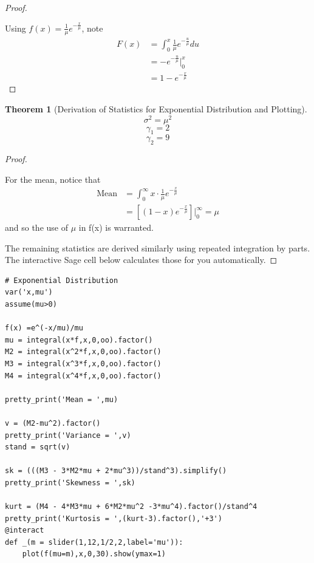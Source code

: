 \documentclass[10pt,]{book}
\theoremstyle{plain}
\newtheorem{theorem}{Theorem}[section]
\theoremstyle{definition}
\theoremstyle{definition}
\theoremstyle{definition}
\numberwithin{equation}{section}
\begin{document}
\begin{proof}\hypertarget{proof-48}{}

	Using \(f(x) = \frac{1}{\mu} e^{-\frac{x}{\mu}}\), note
	\begin{align*}
F(x) & = \int_0^x \frac{1}{\mu} e^{-\frac{u}{\mu}} du\\
 & =  - e^{-\frac{u}{\mu}} \big |_0^x\\
 & = 1 - e^{-\frac{x}{\mu}}
\end{align*}
\end{proof}
\begin{theorem}[{Derivation of Statistics for Exponential Distribution and Plotting}]\label{theorem-50}
\begin{equation*}\sigma^2 = \mu^2\end{equation*}\begin{equation*}\gamma_1 = 2\end{equation*}\begin{equation*}\gamma_2 = 9\end{equation*}\end{theorem}
\begin{proof}\hypertarget{proof-49}{}

	For the mean, notice that
	\begin{align*}
\text{Mean} & = \int_0^{\infty} x \cdot \frac{1}{\mu} e^{-\frac{x}{\mu}} \\
 & = [ (1-x) e^{-\frac{x}{\mu}} ] \big |_0^{\infty} = \mu
\end{align*}
	and so the use of \(\mu\) in f(x) is warranted.
\par

	The remaining statistics are derived similarly using repeated integration by parts. The interactive Sage cell below calculates those for you automatically.
\end{proof}
\par

\begin{lstlisting}[style=sageinput]
# Exponential Distribution
var('x,mu')
assume(mu>0)

f(x) =e^(-x/mu)/mu
mu = integral(x*f,x,0,oo).factor()
M2 = integral(x^2*f,x,0,oo).factor()
M3 = integral(x^3*f,x,0,oo).factor()
M4 = integral(x^4*f,x,0,oo).factor()

pretty_print('Mean = ',mu)

v = (M2-mu^2).factor()
pretty_print('Variance = ',v)
stand = sqrt(v)

sk = (((M3 - 3*M2*mu + 2*mu^3))/stand^3).simplify()
pretty_print('Skewness = ',sk)

kurt = (M4 - 4*M3*mu + 6*M2*mu^2 -3*mu^4).factor()/stand^4
pretty_print('Kurtosis = ',(kurt-3).factor(),'+3')
@interact
def _(m = slider(1,12,1/2,2,label='mu')):
    plot(f(mu=m),x,0,30).show(ymax=1)
\end{lstlisting}
\end{document}
